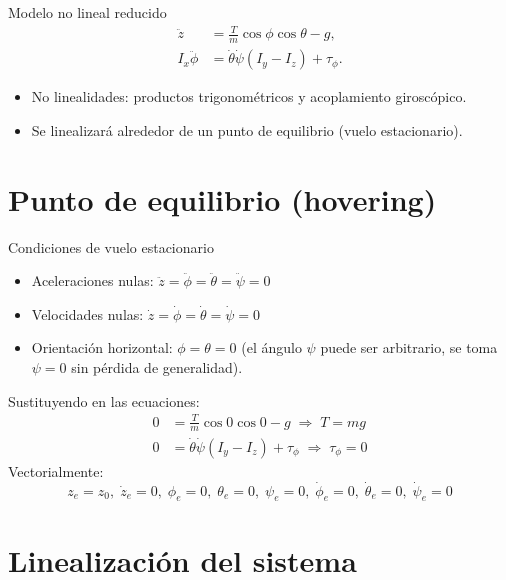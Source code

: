 \documentclass{beamer}
\begin{document}
\begin{frame}{Modelo no lineal reducido}
\[
\begin{aligned}
\ddot{z}      &= \frac{T}{m}\cos\phi\cos\theta - g,\\[2mm]
I_x\ddot{\phi}&= \dot{\theta}\dot{\psi}(I_y - I_z) + \tau_\phi.
\end{aligned}
\]
\begin{itemize}
    \item No linealidades: productos trigonométricos y acoplamiento giroscópico.
    \item Se linealizará alrededor de un punto de equilibrio (vuelo estacionario).
\end{itemize}
\end{frame}

\section{Punto de equilibrio (hovering)}

\begin{frame}{Condiciones de vuelo estacionario}
\begin{itemize}
    \item Aceleraciones nulas: $\ddot{z}=\ddot{\phi}=\ddot{\theta}=\ddot{\psi}=0$
    \item Velocidades nulas: $\dot{z}=\dot{\phi}=\dot{\theta}=\dot{\psi}=0$
    \item Orientación horizontal: $\phi=\theta=0$ (el ángulo $\psi$ puede ser arbitrario, se toma $\psi=0$ sin pérdida de generalidad).
\end{itemize}
Sustituyendo en las ecuaciones:
\begin{align*}
    0 &= \frac{T}{m}\cos0\cos0 - g \;\Rightarrow\; T = mg\\
    0 &= \dot{\theta}\dot{\psi}(I_y-I_z) + \tau_\phi \;\Rightarrow\; \tau_\phi = 0
\end{align*}
Vectorialmente:
\[
z_e = z_0,\; \dot{z}_e=0,\; \phi_e=0,\; \theta_e=0,\; \psi_e=0,\; \dot{\phi}_e=0,\; \dot{\theta}_e=0,\; \dot{\psi}_e=0
\]
\end{frame}

\section{Linealización del sistema}
\end{document}
